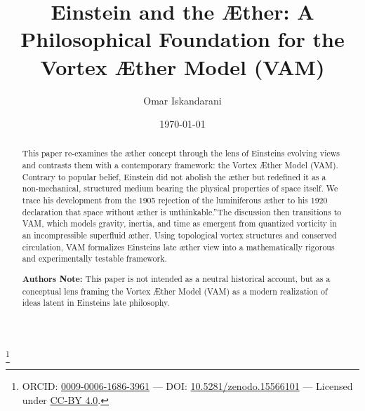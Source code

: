 \documentclass[a4paper,12pt]{revtex4}
\begin{document}
    \date{\today}
    \author{Omar Iskandarani}
    \title{Einstein and the Æther: A Philosophical Foundation for the Vortex Æther Model (VAM)}
    \thanks{ORCID: \href{https://orcid.org/0009-0006-1686-3961}{0009-0006-1686-3961} — \footnotesize DOI: \href{https://doi.org/10.5281/zenodo.15566101}{10.5281/zenodo.15566101}  — Licensed under \href{https://creativecommons.org/licenses/by/4.0/}{CC-BY 4.0}.}


    \begin{abstract}
        This paper re-examines the æther concept through the lens of Einstein\rqs s evolving views and contrasts them with a contemporary framework: the Vortex Æther Model (VAM). Contrary to popular belief, Einstein did not abolish the æther but redefined it as a non-mechanical, structured medium bearing the physical properties of space itself. We trace his development from the 1905 rejection of the luminiferous æther to his 1920 declaration that \grqq space without æther is unthinkable.\textquotedblright The discussion then transitions to VAM, which models gravity, inertia, and time as emergent from quantized vorticity in an incompressible superfluid æther. Using topological vortex structures and conserved circulation, VAM formalizes Einstein\rqs s late æther view into a mathematically rigorous and experimentally testable framework.

        \textbf{Author\rqs s Note:} This paper is not intended as a neutral historical account, but as a conceptual lens framing the Vortex Æther Model (VAM) as a modern realization of ideas latent in Einstein\rqs s late philosophy.
    \end{abstract}

    \maketitle

    
    
    

    \appendix \label{sec:Appendix}
        
        
        

    
    
\end{document}
